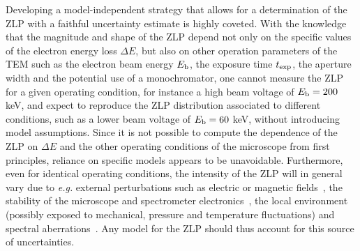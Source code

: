 Developing a model-independent strategy that allows for a determination of the ZLP
with a faithful uncertainty estimate is highly coveted.
%
With the knowledge that the magnitude and shape of the ZLP depend
not only on the specific values
of the electron energy loss $\Delta E$, but also on other operation parameters
of the TEM such as the electron beam energy $E_{\rm b}$, the exposure time
$t_{\rm exp}$, the aperture width and the potential use of a monochromator,
one cannot measure the ZLP for a given operating
condition, for instance a high beam voltage of $E_{\rm b}=200$ keV, and expect to reproduce
the ZLP distribution
associated to different conditions, such as a lower beam voltage of $E_{\rm b}=60$ keV,
without introducing model assumptions.
%
Since it is not possible to compute the dependence of the ZLP on $\Delta E$
and the other operating conditions of the microscope from first principles,
reliance on specific models appears to be unavoidable.
%
Furthermore, even for identical operating conditions, 
the intensity of the ZLP will in general vary due to {\it e.g.} external perturbations 
such as electric or magnetic fields~\cite{Rafferty:2000},
the stability of the microscope and spectrometer electronics~\cite{Kothleitner:2003}, 
the local environment (possibly exposed to mechanical, pressure and temperature fluctuations) 
and spectral aberrations~\cite{Egerton:1996}. 
%
Any model for the ZLP should thus account for this source of uncertainties.

